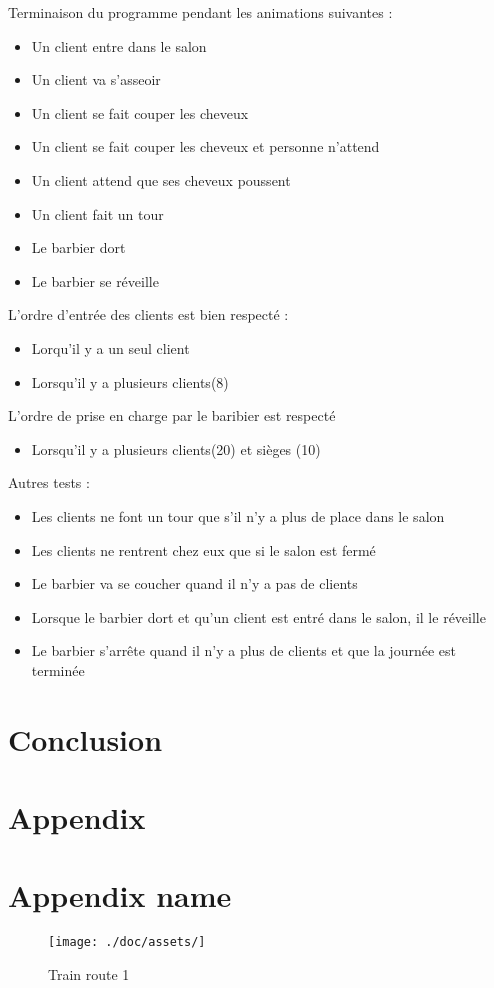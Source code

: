 \documentclass{article}
\begin{document}
    Terminaison du programme pendant les animations suivantes :
    \begin{itemize}
        \item Un client entre dans le salon
        \item Un client va s'asseoir
        \item Un client se fait couper les cheveux
        \item Un client se fait couper les cheveux et personne n'attend
        \item Un client attend que ses cheveux poussent
        \item Un client fait un tour
        \item Le barbier dort
        \item Le barbier se réveille
    \end{itemize}

    L'ordre d'entrée des clients est bien respecté :
    \begin{itemize}
        \item Lorqu'il y a un seul client
        \item Lorsqu'il y a plusieurs clients(8)
    \end{itemize}

    L'ordre de prise en charge par le baribier est respecté
    \begin{itemize}
        \item Lorsqu'il y a plusieurs clients(20) et sièges (10)
    \end{itemize}

    Autres tests :
    \begin{itemize}
        \item Les clients ne font un tour que s'il n'y a plus de place dans le salon
        \item Les clients ne rentrent chez eux que si le salon est fermé
        \item Le barbier va se coucher quand il n'y a pas de clients
        \item Lorsque le barbier dort et qu'un client est entré dans le salon, il le réveille
        \item Le barbier s'arrête quand il n'y a plus de clients et que la journée est terminée
    \end{itemize}

    \section{Conclusion}

    \section*{Appendix}

    \section{Appendix name}
    \begin{figure}[!htb]
        \centering
        \texttt{[image: ./doc/assets/]}
        \caption{Train route 1}
    \end{figure}
\end{document}
